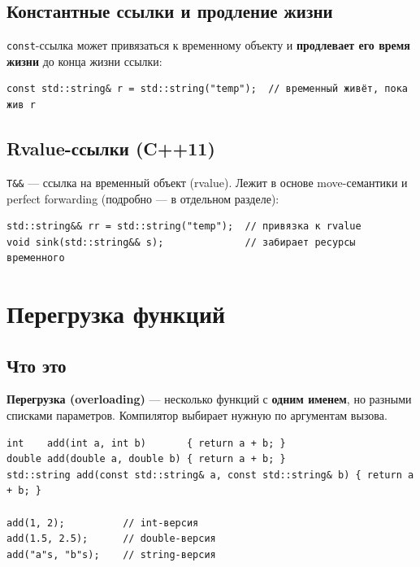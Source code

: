 \subsection{Константные ссылки и продление жизни}

\texttt{const}-ссылка может привязаться к временному объекту и \textbf{продлевает
его время жизни} до конца жизни ссылки:

\begin{lstlisting}
const std::string& r = std::string("temp");  // временный живёт, пока жив r
\end{lstlisting}

\subsection{Rvalue-ссылки (C++11)}

\texttt{T\&\&} --- ссылка на временный объект (rvalue). Лежит в основе
move-семантики и perfect forwarding (подробно --- в отдельном разделе):

\begin{lstlisting}
std::string&& rr = std::string("temp");  // привязка к rvalue
void sink(std::string&& s);              // забирает ресурсы временного
\end{lstlisting}


\section{Перегрузка функций}

\subsection{Что это}

\textbf{Перегрузка (overloading)} --- несколько функций с \textbf{одним именем},
но разными списками параметров. Компилятор выбирает нужную по аргументам вызова.

\begin{lstlisting}
int    add(int a, int b)       { return a + b; }
double add(double a, double b) { return a + b; }
std::string add(const std::string& a, const std::string& b) { return a + b; }

add(1, 2);          // int-версия
add(1.5, 2.5);      // double-версия
add("a"s, "b"s);    // string-версия
\end{lstlisting}

